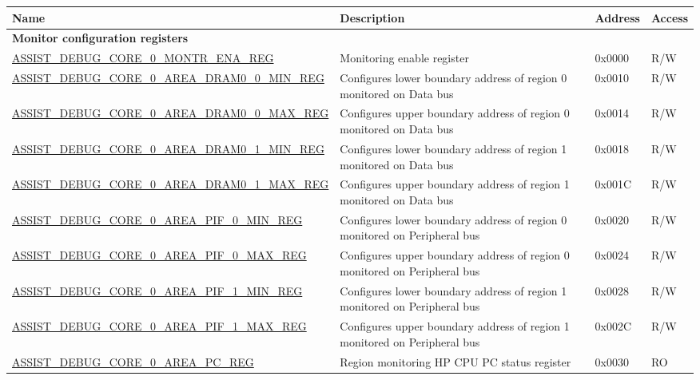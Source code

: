 \begin{longtable}{ | l| m{4cm} | l | l | }
\hline\rowcolor{lightgray}
{\bfseries Name} & {\bfseries Description} &  {\bfseries Address} & {\bfseries Access} \\ \hline
\endhead
\multicolumn{4}{|l|}{\textbf{Monitor configuration registers}} \\ \hline
\hyperref[regdesc:ASSISTDEBUGCORE0MONTRENAREG]{ASSIST\_DEBUG\_CORE\_0\_MONTR\_ENA\_REG} & Monitoring enable register & 0x0000 & R/W \\ \hline
\hyperref[regdesc:ASSISTDEBUGCORE0AREADRAM00MINREG]{ASSIST\_DEBUG\_CORE\_0\_AREA\_DRAM0\_0\_MIN\_REG} &  Configures lower boundary address of region 0 monitored on Data bus & 0x0010 & R/W \\ \hline
\hyperref[regdesc:ASSISTDEBUGCORE0AREADRAM00MAXREG]{ASSIST\_DEBUG\_CORE\_0\_AREA\_DRAM0\_0\_MAX\_REG} &  Configures upper boundary address of region 0 monitored on Data bus & 0x0014 & R/W \\ \hline
\hyperref[regdesc:ASSISTDEBUGCORE0AREADRAM01MINREG]{ASSIST\_DEBUG\_CORE\_0\_AREA\_DRAM0\_1\_MIN\_REG} &  Configures lower boundary address of region 1 monitored on Data bus & 0x0018 & R/W \\ \hline
\hyperref[regdesc:ASSISTDEBUGCORE0AREADRAM01MAXREG]{ASSIST\_DEBUG\_CORE\_0\_AREA\_DRAM0\_1\_MAX\_REG} & Configures upper boundary address of region 1 monitored on Data bus & 0x001C & R/W \\ \hline
\hyperref[regdesc:ASSISTDEBUGCORE0AREAPIF0MINREG]{ASSIST\_DEBUG\_CORE\_0\_AREA\_PIF\_0\_MIN\_REG} & Configures lower boundary address of region 0 monitored on Peripheral bus & 0x0020 & R/W \\ \hline
\hyperref[regdesc:ASSISTDEBUGCORE0AREAPIF0MAXREG]{ASSIST\_DEBUG\_CORE\_0\_AREA\_PIF\_0\_MAX\_REG} & Configures upper boundary address of region 0 monitored on Peripheral bus & 0x0024 & R/W \\ \hline
\hyperref[regdesc:ASSISTDEBUGCORE0AREAPIF1MINREG]{ASSIST\_DEBUG\_CORE\_0\_AREA\_PIF\_1\_MIN\_REG} & Configures lower boundary address of region 1 monitored on Peripheral bus & 0x0028 & R/W \\ \hline
\hyperref[regdesc:ASSISTDEBUGCORE0AREAPIF1MAXREG]{ASSIST\_DEBUG\_CORE\_0\_AREA\_PIF\_1\_MAX\_REG} & Configures upper boundary address of region 1 monitored on Peripheral bus & 0x002C & R/W \\ \hline
\hyperref[regdesc:ASSISTDEBUGCORE0AREAPCREG]{ASSIST\_DEBUG\_CORE\_0\_AREA\_PC\_REG} & Region monitoring HP CPU PC status register  & 0x0030 & RO \\ \hline

\end{longtable}
